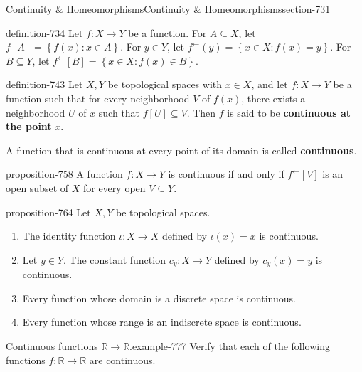 \documentclass[oneside,10pt,]{article}
\newcommand{\terminology}[1]{\textbf{#1}}
\newcommand{\mb}{\mathbb}
\newcommand{\setBuilder}[2]{\left\{#1:#2\right\}}
\begin{document}
\begin{sectionptx}{Continuity \& Homeomorphisms}{}{Continuity \& Homeomorphisms}{}{}{section-731}
\begin{definition}{}{definition-734}%
\hypertarget{p-735}{}%
Let \(f:X\to Y\) be a function. For \(A\subseteq X\), let \(f[A]=\setBuilder{f(x)}{x\in A}\). For \(y\in Y\), let \(f^\leftarrow(y)=\setBuilder{x\in X}{f(x)=y}\). For \(B\subseteq Y\), let \(f^\leftarrow[B]=\setBuilder{x\in X}{f(x)\in B}\).%
\end{definition}
\begin{definition}{}{definition-743}%
\hypertarget{p-744}{}%
Let \(X,Y\) be topological spaces with \(x\in X\), and let \(f:X\to Y\) be a function such that for every neighborhood \(V\) of \(f(x)\), there exists a neighborhood \(U\) of \(x\) such that \(f[U]\subseteq V\). Then \(f\) is said to be \terminology{continuous at the point} \(x\).%
\par
\hypertarget{p-756}{}%
A function that is continuous at every point of its domain is called \terminology{continuous}.%
\end{definition}
\begin{proposition}{}{}{proposition-758}%
\hypertarget{p-759}{}%
A function \(f:X\to Y\) is continuous if and only if \(f^\leftarrow[V]\) is an open subset of \(X\) for every open \(V\subseteq Y\).%
\end{proposition}
\begin{proposition}{}{}{proposition-764}%
\hypertarget{p-765}{}%
Let \(X,Y\) be topological spaces.%
\leavevmode%
\begin{enumerate}
\item\hypertarget{li-768}{}The identity function \(\iota:X\to X\) defined by \(\iota(x)=x\) is continuous.%
\item\hypertarget{li-771}{}Let \(y\in Y\). The constant function \(c_y:X\to Y\) defined by \(c_y(x)=y\) is continuous.%
\item\hypertarget{li-775}{}Every function whose domain is a discrete space is continuous.%
\item\hypertarget{li-776}{}Every function whose range is an indiscrete space is continuous.%
\end{enumerate}
\end{proposition}
\begin{example}{Continuous functions \(\mb R\to\mb R\).}{example-777}%
\hypertarget{p-780}{}%
Verify that each of the following functions \(f:\mb R\to\mb R\) are continuous.%
\leavevmode%
\begin{enumerate}

\end{enumerate}
\end{example}
\end{sectionptx}
\end{document}

